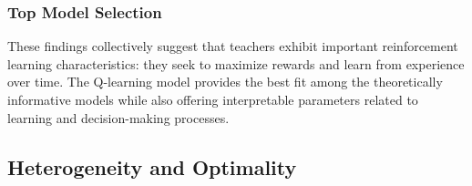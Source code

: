 \documentclass[
  number,
  preprint,
  3p,
  onecolumn]{elsarticle}
\begin{document}
\subsubsection{Top Model Selection}\label{top-model-selection}

These findings collectively suggest that teachers exhibit important
reinforcement learning characteristics: they seek to maximize rewards
and learn from experience over time. The Q-learning model provides the
best fit among the theoretically informative models while also offering
interpretable parameters related to learning and decision-making
processes.

\subsection{Heterogeneity and
Optimality}\label{heterogeneity-and-optimality}
\end{document}

